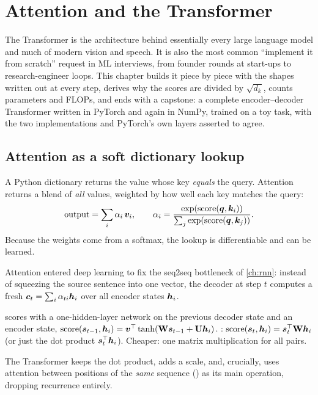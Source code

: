 \chapter{Attention and the Transformer}
\label{ch:transformer}

The Transformer \cite{vaswani} is the architecture behind essentially every large
language model and much of modern vision and speech. It is also the most common
``implement it from scratch'' request in ML interviews, from founder rounds at
start-ups to research-engineer loops. This chapter builds it piece by piece with the
shapes written out at every step, derives why the scores are divided by $\sqrt{d_k}$,
counts parameters and FLOPs, and ends with a capstone: a complete encoder--decoder
Transformer written in PyTorch and again in NumPy, trained on a toy task, with the two
implementations and PyTorch's own layers asserted to agree.

\section{Attention as a soft dictionary lookup}

A Python dictionary returns the value whose key \emph{equals} the query. Attention returns
a blend of \emph{all} values, weighted by how well each key matches the query:
\[
	\text{output}=\sum_i\alpha_i\,{\bm{v}}_i,\qquad
	\alpha_i=\frac{\exp(\mathrm{score}(\bm{q},\bm{k}_i))}{\sum_j\exp(\mathrm{score}(\bm{q},\bm{k}_j))}.
\]
Because the weights come from a softmax, the lookup is differentiable and can be learned.

Attention entered deep learning to fix the seq2seq bottleneck of \cref{ch:rnn}: instead of
squeezing the source sentence into one vector, the decoder at step $t$ computes a fresh
 $\bm{c}_t=\sum_i\alpha_{ti}{\bm{h}}_i$ over all encoder states ${\bm{h}}_i$.
\begin{itemize}
	\ii {} \cite{bahdanau} scores with a one-hidden-layer
	network on the previous decoder state and an encoder state,
	$\mathrm{score}(\bm{s}_{t-1},{\bm{h}}_i)={\bm{v}}^{\top}\tanh({\mathbf{W}}\bm{s}_{t-1}+{\mathbf{U}}{\bm{h}}_i)$.
	\ii {}: $\mathrm{score}(\bm{s}_t,{\bm{h}}_i)=\bm{s}_t^{\top}{\mathbf{W}}{\bm{h}}_i$ (or just
	the dot product $\bm{s}_t^{\top}{\bm{h}}_i$). Cheaper: one matrix multiplication for all pairs.
\end{itemize}
The Transformer keeps the dot product, adds a scale, and, crucially, uses attention between
positions of the \emph{same} sequence () as its main operation, dropping
recurrence entirely.

